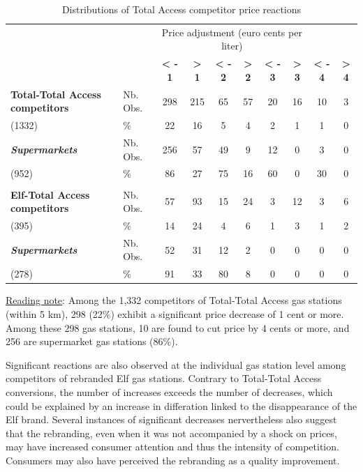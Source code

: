 \documentclass[english]{article}
\begin{document}
\begin{table}
\caption{Distributions of Total Access competitor price reactions}
\label{tab:competitor_price_reactions_stats}
\begin{threeparttable}
\begin{tiny}
\begin{tabular}{llcccccccc}
\hline
\hline
{} & {} & \multicolumn{6}{c}{Price adjustment (euro cents per liter)} \tabularnewline
 &  & \textbf{< - 1}  & \textbf{> 1}  & \textbf{< - 2}  & \textbf{> 2}  & \textbf{< - 3}  & \textbf{> 3}  & \textbf{< - 4}  & \textbf{> 4}\tabularnewline
\hline
\textbf{Total-Total Access competitors}  & Nb. Obs.  & 298  & 215  & 65  & 57  & 20  & 16  & 10  & 3\tabularnewline
(1332)  & \%  & 22  & 16  & 5  & 4  & 2  & 1  & 1  & 0\tabularnewline
\textbf{\textit{Supermarkets}}  & Nb. Obs.  & 256  & 57  & 49  & 9  & 12  & 0  & 3  & 0\tabularnewline
(952)  & \%  & 86  & 27  & 75  & 16  & 60  & 0  & 30  & 0\tabularnewline
 &  &  &  &  &  &  &  &  & \tabularnewline
\hline
\textbf{Elf-Total Access competitors}  & Nb. Obs.  & 57  & 93  & 15  & 24  & 3  & 12  & 3  & 6\tabularnewline
(395)  & \%  & 14  & 24  & 4  & 6  & 1  & 3  & 1  & 2\tabularnewline
\textbf{\textit{Supermarkets}}  & Nb. Obs.  & 52  & 31  & 12  & 2  & 0  & 0  & 0  & 0\tabularnewline
(278)  & \%  & 91  & 33  & 80  & 8  & 0  & 0  & 0  & 0\tabularnewline
\hline
\hline
\end{tabular}
\end{tiny}
\end{threeparttable}
\parbox{\textwidth}{\small%
\vspace{2eX} %
{\small{}\uline{Reading note}}{\small{}:} Among the 1,332 competitors of Total-Total Access gas stations (within 5 km), 298 (22\%) exhibit a significant price decrease of 1 cent or more. Among these 298 gas stations, 10 are found to cut price by 4 cents or more, and 256 are supermarket gas stations (86\%).}
\end{table}

Significant reactions are also observed at the individual gas station level among competitors of rebranded Elf gas stations. Contrary to Total-Total Access conversions, the number of increases exceeds the number of decreases, which could be explained by an increase in differation linked to the disappearance of the Elf brand. Several instances of significant decreases nervertheless also suggest that the rebranding, even when it was not accompanied by a shock on prices, may have increased consumer attention and thus the intensity of competition. Consumers may also have perceived the rebranding as a quality improvement.
\end{document}
